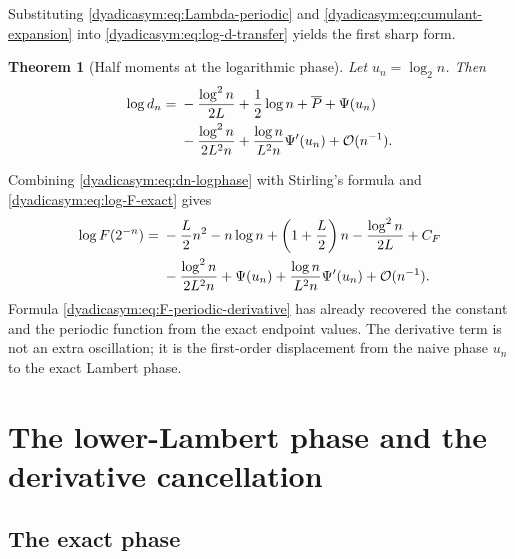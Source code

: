 \documentclass[11pt,oneside]{article}
\newtheorem{theorem}{Theorem}[section]
\theoremstyle{definition}
\theoremstyle{remark}
\newcommand{\bigO}{\mathcal O}
\begin{document}
Substituting \eqref{dyadicasym:eq:Lambda-periodic} and \eqref{dyadicasym:eq:cumulant-expansion} into
\eqref{dyadicasym:eq:log-d-transfer} yields the first sharp form.

\begin{theorem}[Half moments at the logarithmic phase]
\label{dyadicasym:thm:dn-logphase}
Let $u_n=\log_2n$.  Then
\begin{align}
 \log d_n={}&-\frac{\log^2n}{2L}+\frac12\log n
 +\overline P+\Psi(u_n)                                    \notag\\
 &-\frac{\log^2n}{2L^2n}
 +\frac{\log n}{L^2n}\Psi'(u_n)+\bigO(n^{-1}).             \label{dyadicasym:eq:dn-logphase}
\end{align}
\end{theorem}

Combining \eqref{dyadicasym:eq:dn-logphase} with Stirling's formula and
\eqref{dyadicasym:eq:log-F-exact} gives
\begin{align}
 \log F(2^{-n})={}&-\frac L2n^2-n\log n+
 \left(1+\frac L2\right)n-\frac{\log^2n}{2L}+C_F           \notag\\
 &-\frac{\log^2n}{2L^2n}+\Psi(u_n)
 +\frac{\log n}{L^2n}\Psi'(u_n)+\bigO(n^{-1}).             \label{dyadicasym:eq:F-periodic-derivative}
\end{align}
Formula \eqref{dyadicasym:eq:F-periodic-derivative} has already recovered the constant and the periodic
function from the exact endpoint values.  The derivative term is not an extra oscillation; it
is the first-order displacement from the naive phase $u_n$ to the exact Lambert phase.

\section{The lower-Lambert phase and the derivative cancellation}
\label{dyadicasym:sec:lambert-phase}

\subsection{The exact phase}
\end{document}
